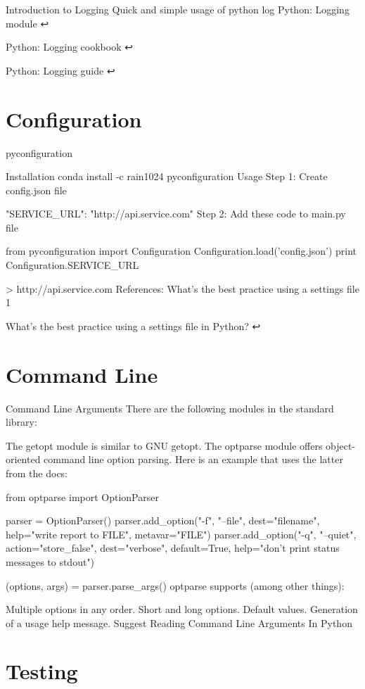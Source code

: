 Introduction to Logging
Quick and simple usage of python log
Python: Logging module ↩

Python: Logging cookbook ↩

Python: Logging guide ↩

\section{Configuration}

pyconfiguration

Installation
conda install -c rain1024 pyconfiguration
Usage
Step 1: Create config.json file

{
  "SERVICE_URL": "http://api.service.com"
}
Step 2: Add these code to main.py file

from pyconfiguration import Configuration
Configuration.load('config.json')
print Configuration.SERVICE_URL

> http://api.service.com
References: What's the best practice using a settings file 1

What's the best practice using a settings file in Python? ↩

\section{Command Line}

Command Line Arguments
There are the following modules in the standard library:

The getopt module is similar to GNU getopt.
The optparse module offers object-oriented command line option parsing.
Here is an example that uses the latter from the docs:

from optparse import OptionParser

parser = OptionParser()
parser.add_option("-f", "--file", dest="filename",
                  help="write report to FILE", metavar="FILE")
parser.add_option("-q", "--quiet",
                  action="store_false", dest="verbose", default=True,
                  help="don't print status messages to stdout")

(options, args) = parser.parse_args()
optparse supports (among other things):

Multiple options in any order.
Short and long options.
Default values.
Generation of a usage help message.
Suggest Reading
Command Line Arguments In Python

\section{Testing}

